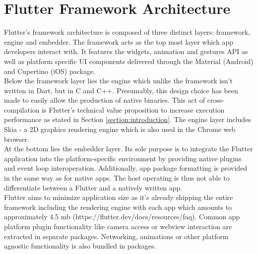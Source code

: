 \section{Flutter Framework Architecture} \label{section::flutter_architecture}
Flutter's framework architecture is composed of three distinct layers: framework, engine and embedder. The framework acts as the top most layer which 
app developers interact with. It features the widgets, animation and gestures API as well as platform specific UI components delivered through
the Material (Android) and Cupertino (iOS) package.
\\
Below the framework layer lies the engine which unlike the framework isn't written in Dart, but in C and C++. Presumably, this design choice has been 
made to easily allow the production of native binaries. This act of cross-compilation is Flutter's technical value proposition to increase execution performance as stated in 
Section \ref{section:introduction}. The engine layer includes Skia - a 2D graphics rendering engine which is also used in the Chrome web browser.
\\
At the bottom lies the embedder layer. Its sole purpose is to integrate the Flutter application into the platform-specific environment
by providing native plugins and event loop interoperation. 
Additionally, app package formatting is provided in the same way as for native apps. 
The host operating is thus not able to differentiate between a Flutter and a natively written app.\\ 
Flutter aims to minimize application size as it's already shipping the entire framework including the rendering engine with each app which amounts
to approximately 4.5 mb (https://flutter.dev/docs/resources/faq). Common app platform plugin functionality like camera access or webview 
interaction are extracted in separate packages. Networking, animations or other platform agnostic functionality is also bundled in packages. 

